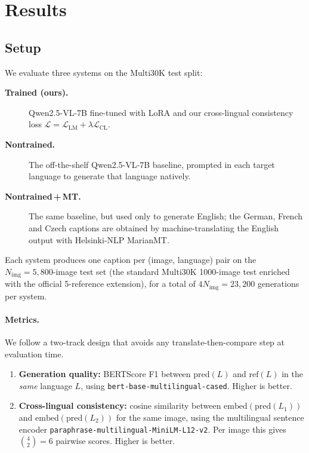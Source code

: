 \documentclass[11pt]{article}
\begin{document}
\section{Results}
\label{sec:results}

\subsection{Setup}

We evaluate three systems on the Multi30K test split:

\begin{description}
\item[\textbf{Trained (ours).}] Qwen2.5-VL-7B fine-tuned with LoRA and our
cross-lingual consistency loss
$\mathcal{L}\!=\!\mathcal{L}_{\text{LM}}\!+\!\lambda\mathcal{L}_{\text{CL}}$.
\item[\textbf{Nontrained.}] The off-the-shelf Qwen2.5-VL-7B baseline,
prompted in each target language to generate that language natively.
\item[\textbf{Nontrained\,+\,MT.}] The same baseline, but used only to
generate English; the German, French and Czech captions are obtained by
machine-translating the English output with Helsinki-NLP MarianMT.
\end{description}

Each system produces one caption per (image, language) pair on the
$N_{\text{img}}\!=\!5{,}800$-image test set (the standard Multi30K
1000-image test enriched with the official 5-reference extension), for
a total of $4 N_{\text{img}}\!=\!23{,}200$ generations per system.

\paragraph{Metrics.}
We follow a two-track design that avoids any translate-then-compare
step at evaluation time.

\begin{enumerate}
\item \textbf{Generation quality:} BERTScore F1 between
$\text{pred}(L)$ and $\text{ref}(L)$ in the \emph{same} language $L$,
using \texttt{bert-base-multilingual-cased}. Higher is better.
\item \textbf{Cross-lingual consistency:} cosine similarity between
$\text{embed}(\text{pred}(L_1))$ and $\text{embed}(\text{pred}(L_2))$
for the same image, using the multilingual sentence encoder
\texttt{paraphrase-multilingual-MiniLM-L12-v2}. Per image this gives
$\binom{4}{2}\!=\!6$ pairwise scores. Higher is better.
\end{enumerate}
\end{document}
